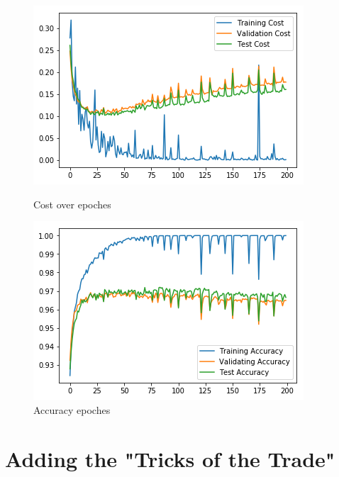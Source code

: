 \documentclass{article}
\begin{document}
\begin{figure}[h]
	\begin{minipage}{0.4\textwidth}
		\centering
		\includegraphics[width=\textwidth]{pics/cost_default.png}
		\caption{Cost over epoches}
	\end{minipage}\hfill
	\begin{minipage}{0.4\textwidth}
		\centering
		\includegraphics[width=\textwidth]{pics/acc_default.png}
		\caption{Accuracy epoches}
	\end{minipage}\hfill
\end{figure}

\newpage
\section{Adding the "Tricks of the Trade"}
\end{document}
